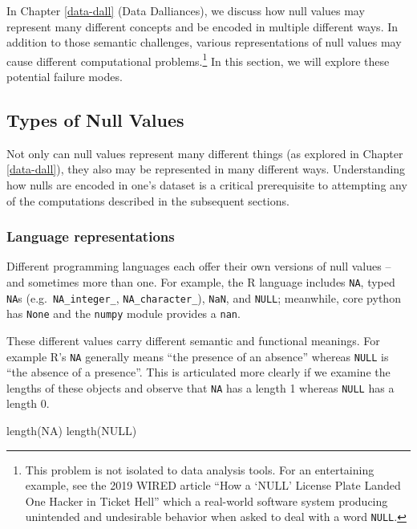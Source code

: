 \documentclass[
]{krantz}
\makeatletter
\newenvironment{Shaded}{\begin{snugshade}}{\end{snugshade}}
\newcommand{\ConstantTok}[1]{\textcolor[rgb]{0,0,0}{#1}}
\newcommand{\FunctionTok}[1]{\textcolor[rgb]{0,0,0}{#1}}
\newcommand{\NormalTok}[1]{#1}
\newenvironment{kframe}{%
\medskip{}
\setlength{\fboxsep}{.8em}
 \def\at@end@of@kframe{}%
 \ifinner\ifhmode%
  \def\at@end@of@kframe{\end{minipage}}%
  \begin{minipage}{\columnwidth}%
 \fi\fi%
 \def\FrameCommand##1{\hskip\@totalleftmargin \hskip-\fboxsep
 \colorbox{shadecolor}{##1}\hskip-\fboxsep
     \hskip-\linewidth \hskip-\@totalleftmargin \hskip\columnwidth}%
 \MakeFramed {\advance\hsize-\width
   \@totalleftmargin\z@ \linewidth\hsize
   \@setminipage}}%
 {\par\unskip\endMakeFramed%
 \at@end@of@kframe}
\renewenvironment{Shaded}{\begin{kframe}}{\end{kframe}}
\makeatother
\begin{document}
In Chapter \ref{data-dall} (Data Dalliances), we discuss how null values may represent many different concepts and be encoded in multiple different ways.
In addition to those semantic challenges, various representations of null values may cause different computational problems.\footnote{This problem is not isolated to data analysis tools. For an entertaining example, see the 2019 WIRED article ``How a `NULL' License Plate Landed One Hacker in Ticket Hell'' \citep{barrett} which a real-world software system producing unintended and undesirable behavior when asked to deal with a word \texttt{\textquotesingle{}NULL\textquotesingle{}}.}
In this section, we will explore these potential failure modes.

\hypertarget{types-of-null-values}{%
\subsection{Types of Null Values}\label{types-of-null-values}}

Not only can null values represent many different things (as explored in Chapter \ref{data-dall}), they also may be represented in many different ways. Understanding how nulls are encoded in one's dataset is a critical prerequisite to attempting any of the computations described in the subsequent sections.

\hypertarget{language-representations}{%
\subsubsection{Language representations}\label{language-representations}}

Different programming languages each offer their own versions of null values -- and sometimes more than one. For example, the R language includes \texttt{NA}, typed \texttt{NA}s (e.g.~\texttt{NA\_integer\_}, \texttt{NA\_character\_}), \texttt{NaN}, and \texttt{NULL}; meanwhile, core python has \texttt{None} and the \texttt{numpy} module provides a \texttt{nan}.

These different values carry different semantic and functional meanings. For example R's \texttt{NA} generally means ``the presence of an absence'' whereas \texttt{NULL} is ``the absence of a presence''. This is articulated more clearly if we examine the lengths of these objects and observe that \texttt{NA} has a length 1 whereas \texttt{NULL} has a length 0.

\begin{Shaded}
\begin{Highlighting}[]
\FunctionTok{length}\NormalTok{(}\ConstantTok{NA}\NormalTok{)}
\FunctionTok{length}\NormalTok{(}\ConstantTok{NULL}\NormalTok{)}
\end{Highlighting}
\end{Shaded}
\end{document}
